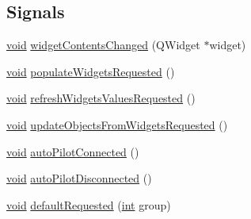 \subsection*{Signals}
\begin{DoxyCompactItemize}
\item 
\hyperlink{group___u_a_v_objects_plugin_ga444cf2ff3f0ecbe028adce838d373f5c}{void} \hyperlink{group___u_a_v_object_widget_utils_gaee198ff7978d5358a93395eb215fa767}{widget\-Contents\-Changed} (Q\-Widget $\ast$widget)
\item 
\hyperlink{group___u_a_v_objects_plugin_ga444cf2ff3f0ecbe028adce838d373f5c}{void} \hyperlink{group___u_a_v_object_widget_utils_gacc1be196d23d5e483f68a990d8ebfae6}{populate\-Widgets\-Requested} ()
\item 
\hyperlink{group___u_a_v_objects_plugin_ga444cf2ff3f0ecbe028adce838d373f5c}{void} \hyperlink{group___u_a_v_object_widget_utils_ga6d4f37af17f3990fd37e9eddbb8f3802}{refresh\-Widgets\-Values\-Requested} ()
\item 
\hyperlink{group___u_a_v_objects_plugin_ga444cf2ff3f0ecbe028adce838d373f5c}{void} \hyperlink{group___u_a_v_object_widget_utils_gae43eee3bcf829dcfc91b17c25bc5db95}{update\-Objects\-From\-Widgets\-Requested} ()
\item 
\hyperlink{group___u_a_v_objects_plugin_ga444cf2ff3f0ecbe028adce838d373f5c}{void} \hyperlink{group___u_a_v_object_widget_utils_ga6812138654a8b49e72c674cee7245781}{auto\-Pilot\-Connected} ()
\item 
\hyperlink{group___u_a_v_objects_plugin_ga444cf2ff3f0ecbe028adce838d373f5c}{void} \hyperlink{group___u_a_v_object_widget_utils_gab874b1ad732a19472dc1a9d29f23d7ae}{auto\-Pilot\-Disconnected} ()
\item 
\hyperlink{group___u_a_v_objects_plugin_ga444cf2ff3f0ecbe028adce838d373f5c}{void} \hyperlink{group___u_a_v_object_widget_utils_ga42fb0be146f76a7ce2ef34e655a3015a}{default\-Requested} (\hyperlink{ioapi_8h_a787fa3cf048117ba7123753c1e74fcd6}{int} group)
\end{DoxyCompactItemize}
